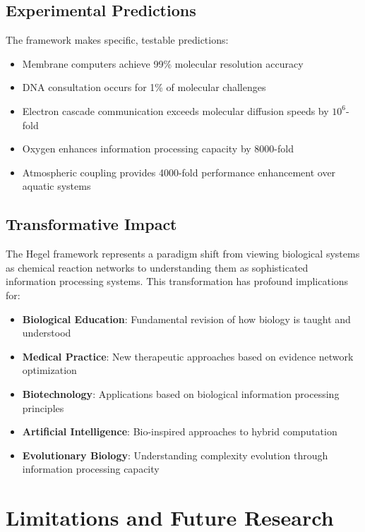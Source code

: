 \documentclass[12pt,a4paper]{article}
\begin{document}
\subsection{Experimental Predictions}

The framework makes specific, testable predictions:
\begin{itemize}
\item Membrane computers achieve 99\% molecular resolution accuracy
\item DNA consultation occurs for 1\% of molecular challenges
\item Electron cascade communication exceeds molecular diffusion speeds by $10^6$-fold
\item Oxygen enhances information processing capacity by 8000-fold
\item Atmospheric coupling provides 4000-fold performance enhancement over aquatic systems
\end{itemize}

\subsection{Transformative Impact}

The Hegel framework represents a paradigm shift from viewing biological systems as chemical reaction networks to understanding them as sophisticated information processing systems. This transformation has profound implications for:

\begin{itemize}
\item \textbf{Biological Education}: Fundamental revision of how biology is taught and understood
\item \textbf{Medical Practice}: New therapeutic approaches based on evidence network optimization
\item \textbf{Biotechnology}: Applications based on biological information processing principles
\item \textbf{Artificial Intelligence}: Bio-inspired approaches to hybrid computation
\item \textbf{Evolutionary Biology}: Understanding complexity evolution through information processing capacity
\end{itemize}

\section{Limitations and Future Research}
\end{document}
